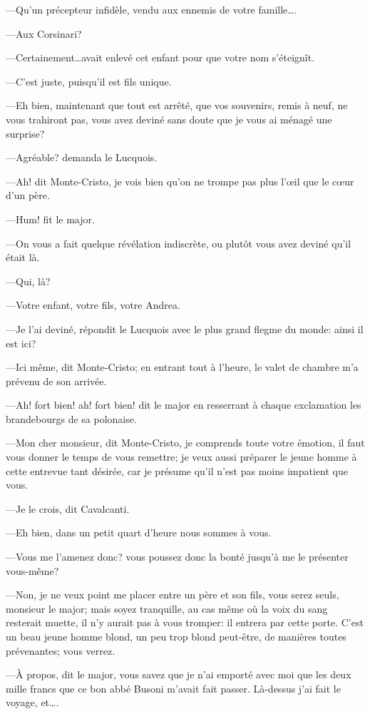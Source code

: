 —Qu'un précepteur infidèle, vendu aux ennemis de votre famille\dots. 

—Aux Corsinari? 

—Certainement\dots avait enlevé cet enfant pour que votre nom s'éteignît. 

—C'est juste, puisqu'il est fils unique. 

—Eh bien, maintenant que tout est arrêté, que vos souvenirs, remis à neuf, ne vous trahiront pas, vous avez deviné sans doute que je vous ai ménagé une surprise? 

—Agréable? demanda le Lucquois. 

—Ah! dit Monte-Cristo, je vois bien qu'on ne trompe pas plus l'œil que le cœur d'un père. 

—Hum! fit le major. 

—On vous a fait quelque révélation indiscrète, ou plutôt vous avez deviné qu'il était là. 

—Qui, là? 

—Votre enfant, votre fils, votre Andrea. 

—Je l'ai deviné, répondit le Lucquois avec le plus grand flegme du monde: ainsi il est ici? 

—Ici même, dit Monte-Cristo; en entrant tout à l'heure, le valet de chambre m'a prévenu de son arrivée. 

—Ah! fort bien! ah! fort bien! dit le major en resserrant à chaque exclamation les brandebourgs de sa polonaise. 

—Mon cher monsieur, dit Monte-Cristo, je comprends toute votre émotion, il faut vous donner le temps de vous remettre; je veux aussi préparer le jeune homme à cette entrevue tant désirée, car je présume qu'il n'est pas moins impatient que vous. 

—Je le crois, dit Cavalcanti. 

—Eh bien, dans un petit quart d'heure nous sommes à vous. 

—Vous me l'amenez donc? vous poussez donc la bonté jusqu'à me le présenter vous-même? 

—Non, je ne veux point me placer entre un père et son fils, vous serez seuls, monsieur le major; mais soyez tranquille, au cas même où la voix du sang resterait muette, il n'y aurait pas à vous tromper: il entrera par cette porte. C'est un beau jeune homme blond, un peu trop blond peut-être, de manières toutes prévenantes; vous verrez. 

—À propos, dit le major, vous savez que je n'ai emporté avec moi que les deux mille francs que ce bon abbé Busoni m'avait fait passer. Là-dessus j'ai fait le voyage, et\dots. 

